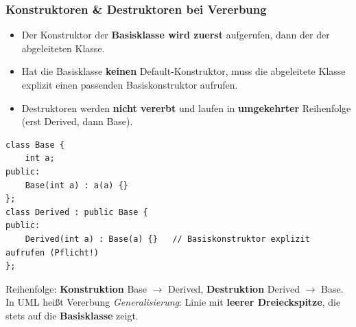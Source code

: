 \subsubsection*{Konstruktoren \& Destruktoren bei Vererbung}
\begin{itemize}
  \item Der Konstruktor der \textbf{Basisklasse wird zuerst} aufgerufen, dann der der abgeleiteten Klasse.
  \item Hat die Basisklasse \textbf{keinen} Default-Konstruktor, muss die abgeleitete Klasse explizit einen passenden Basiskonstruktor aufrufen.
  \item Destruktoren werden \textbf{nicht vererbt} und laufen in \textbf{umgekehrter} Reihenfolge (erst Derived, dann Base).
\end{itemize}
\begin{lstlisting}
class Base {
    int a;
public:
    Base(int a) : a(a) {}
};
class Derived : public Base {
public:
    Derived(int a) : Base(a) {}   // Basiskonstruktor explizit aufrufen (Pflicht!)
};
\end{lstlisting}
\begin{merke}
Reihenfolge: \textbf{Konstruktion} Base $\rightarrow$ Derived, \textbf{Destruktion} Derived $\rightarrow$ Base. In UML hei\ss t Vererbung \emph{Generalisierung}: Linie mit \textbf{leerer Dreieckspitze}, die stets auf die \textbf{Basisklasse} zeigt.
\end{merke}
\clearpage
